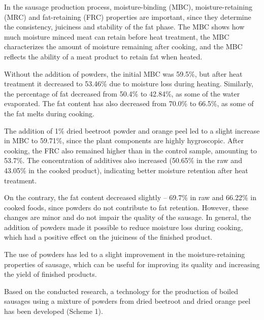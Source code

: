 \begin{multicols}{2}
In the sausage production process, moisture-binding (MBC),
moisture-retaining (MRC) and fat-retaining (FRC) properties are
important, since they determine the consistency, juiciness and stability
of the fat phase. The MBC shows how much moisture minced meat can retain
before heat treatment, the MBC characterizes the amount of moisture
remaining after cooking, and the MBC reflects the ability of a meat
product to retain fat when heated.

Without the addition of powders, the initial MBC was 59.5\%, but after
heat treatment it decreased to 53.46\% due to moisture loss during
heating. Similarly, the percentage of fat decreased from 50.4\% to
42.84\%, as some of the water evaporated. The fat content has also
decreased from 70.0\% to 66.5\%, as some of the fat melts during
cooking.

The addition of 1\% dried beetroot powder and orange peel led to a
slight increase in MBC to 59.71\%, since the plant components are highly
hygroscopic. After cooking, the FRC also remained higher than in the
control sample, amounting to 53.7\%. The concentration of additives also
increased (50.65\% in the raw and 43.05\% in the cooked product),
indicating better moisture retention after heat treatment.

On the contrary, the fat content decreased slightly -- 69.7\% in raw and
66.22\% in cooked foods, since powders do not contribute to fat
retention. However, these changes are minor and do not impair the
quality of the sausage. In general, the addition of powders made it
possible to reduce moisture loss during cooking, which had a positive
effect on the juiciness of the finished product.

The use of powders has led to a slight improvement in the
moisture-retaining properties of sausage, which can be useful for
improving its quality and increasing the yield of finished products.

Based on the conducted research, a technology for the production of
boiled sausages using a mixture of powders from dried beetroot and dried
orange peel has been developed (Scheme 1).
\end{multicols}


